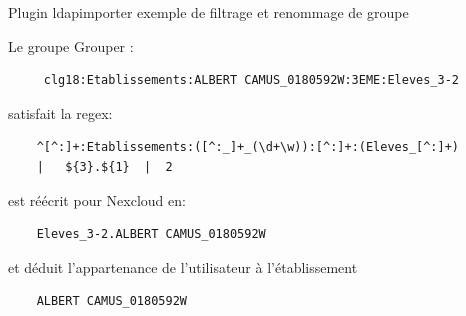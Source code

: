 \begin{frame}[fragile]{Plugin ldapimporter} %
{exemple de filtrage et renommage de groupe}
\begin{list}{}{}
	\item {\tiny Le groupe Grouper :}
\begin{verbatim}
     clg18:Etablissements:ALBERT CAMUS_0180592W:3EME:Eleves_3-2
\end{verbatim}
\item {\tiny satisfait la regex:}
\begin{verbatim}
    ^[^:]+:Etablissements:([^:_]+_(\d+\w)):[^:]+:(Eleves_[^:]+) 
    |   ${3}.${1}  |  2
\end{verbatim}
\item {\tiny est réécrit pour Nexcloud en:}
\begin{verbatim}
    Eleves_3-2.ALBERT CAMUS_0180592W
\end{verbatim}
\item {\tiny et déduit l’appartenance de l'utilisateur à l'établissement}
\begin{verbatim}
    ALBERT CAMUS_0180592W
\end{verbatim}
\end{list}
\end{frame}


